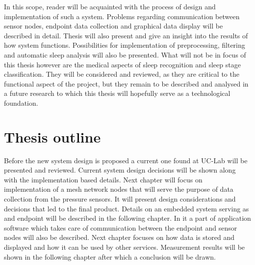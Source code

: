In this scope, reader will be acquainted with the process of design and implementation of such a system. Problems regarding communication between sensor nodes, endpoint data collection and graphical data display will be described in detail. Thesis will also present and give an insight into the results of how system functions. Possibilities for implementation of preprocessing, filtering and automatic sleep analysis will also be presented. What will not be in focus of this thesis however are the medical aspects of sleep recognition and sleep stage classification. They will be considered and reviewed, as they are critical to the functional aspect of the project, but they remain to be described and analysed in a future research to which this thesis will hopefully serve as a technological foundation.


\section{Thesis outline}

Before the new system design is proposed a current one found at \ac{UC-Lab} will be presented and reviewed. Current system design decisions will be shown along with the implementation based details. Next chapter will focus on implementation of a mesh network nodes that will serve the purpose of data collection from the pressure sensors. It will present design considerations and decisions that led to the final product. Details on an embedded system serving as and endpoint will be described in the following chapter. In it a part of application software which takes care of communication between the endpoint and sensor nodes will also be described. Next chapter focuses on how data is stored and displayed and how it can be used by other services. Measurement results will be shown in the following chapter after which a conclusion will be drawn.